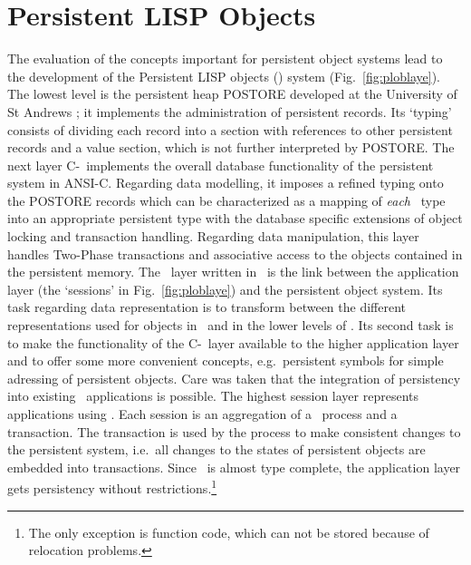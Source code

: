 \documentclass[a4paper%
]{article}
\newcommand\showfigrule{0pt}
\renewcommand\figurename{Fig.}
\begin{document}
\section{Persistent LISP Objects}
%
\begin{figwindow}[2,r,{\rule{\showfigrule}{9.5\baselineskip}%
                       \psfig{figure=ploblaye.eps}},
                  {\plob\ layers%
                   \label{fig:ploblaye}}]
%
\noindent%
The evaluation of the concepts important for persistent object systems
lead to the development of the Persistent LISP objects (\plob) system
(\figurename~\ref{fig:ploblaye}). The lowest level is the persistent
heap POSTORE developed at the University of St Andrews
\cite{bib:br92}; it implements the administration of persistent
records. Its `typing' consists of dividing each record into a section
with references to other persistent records and a value section, which
is not further interpreted by POSTORE.
%
The next layer C-\plob\ implements the overall database functionality
of the persistent system in ANSI-C. Regarding data modelling, it
imposes a refined typing onto the POSTORE records which can be
characterized as a mapping of \emph{each} \clos\ type into an
appropriate persistent type with the database specific extensions of
object locking and transaction handling. Regarding data manipulation,
this layer handles Two-Phase transactions and associative access to
the objects contained in the persistent memory.
%
The \plob\ layer written in \clos\ is the link between the application
layer (the `sessions' in \figurename~\ref{fig:ploblaye}) and the
persistent object system. Its task regarding data representation is to
transform between the different representations used for objects in
\clos\ and in the lower levels of \plob.
Its second task is to make the functionality of the C-\plob\ layer
available to the higher application layer and to offer some more
convenient concepts, e.g.\ persistent symbols for simple adressing of
persistent objects. Care was taken that the integration of persistency
into existing \clos\ applications is possible.
%
The highest session layer represents applications using \plob. Each
session is an aggregation of a \clos\ process and a transaction. The
transaction is used by the process to make consistent changes to the
persistent system, i.e.\ all changes to the states of persistent
objects are embedded into transactions. Since \plob\ is almost type
complete, the application layer gets persistency without
restrictions.\footnote{The only exception is function code, which can
not be stored because of relocation problems.}
\end{figwindow}
%
\end{document}
